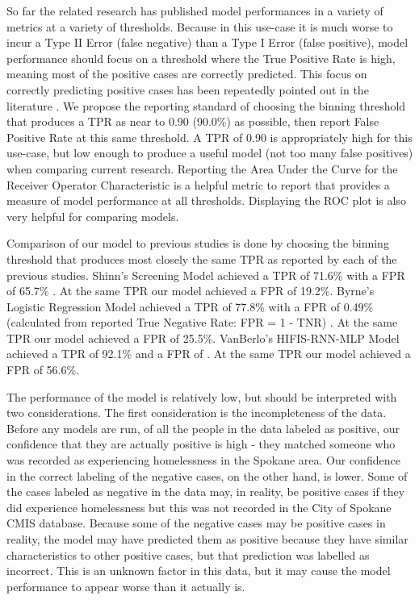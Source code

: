 \documentclass[10pt,letterpaper]{article}
\newcommand{\red}[1]{{\color{red}{#1}}}
\begin{document}
So far the related research has published model performances in a variety of metrics at a variety of thresholds. Because in this use-case it is much worse to incur a Type II Error (false negative) than a Type I Error (false positive), model performance should focus on a threshold where the True Positive Rate is high, meaning most of the positive cases are correctly predicted. This focus on correctly predicting positive cases has been repeatedly pointed out in the literature \red{TODO: cite this}. We propose the reporting standard of choosing the binning threshold that produces a TPR as near to 0.90 (90.0\%) as possible, then report False Positive Rate at this same threshold. A TPR of 0.90 is appropriately high for this use-case, but low enough to produce a useful model (not too many false positives) when comparing current research. Reporting the Area Under the Curve for the Receiver Operator Characteristic is a helpful metric to report that provides a measure of model performance at all thresholds. Displaying the ROC plot is also very helpful for comparing models. 

Comparison of our model to previous studies is done by choosing the binning threshold that produces most closely the same TPR as reported by each of the previous studies. Shinn's Screening Model achieved a TPR of 71.6\% with a FPR of 65.7\% \cite{shinn2013efficient}. At the same TPR our model achieved a FPR of 19.2\%. Byrne's Logistic Regression Model achieved a TPR of 77.8\% with a FPR of 0.49\% (calculated from reported True Negative Rate: FPR = 1 - TNR) \red{ADD CITATION}. At the same TPR our model achieved a FPR of 25.5\%. VanBerlo's HIFIS-RNN-MLP Model achieved a TPR of 92.1\% and a FPR of \red{ADD HERE, ADD CITATION}. At the same TPR our model achieved a FPR of 56.6\%.

The performance of the model is relatively low, but should be interpreted with two considerations. The first consideration is the incompleteness of the data. Before any models are run, of all the people in the data labeled as positive, our confidence that they are actually positive is high - they matched someone who was recorded as experiencing homelessness in the Spokane area. Our confidence in the correct labeling of the negative cases, on the other hand, is lower. Some of the cases labeled as negative in the data may, in reality, be positive cases if they did experience homelessness but this was not recorded in the City of Spokane CMIS database. Because some of the negative cases may be positive cases in reality, the model may have predicted them as positive because they have similar characteristics to other positive cases, but that prediction was labelled as incorrect. This is an unknown factor in this data, but it may cause the model performance to appear worse than it actually is.
\end{document}
